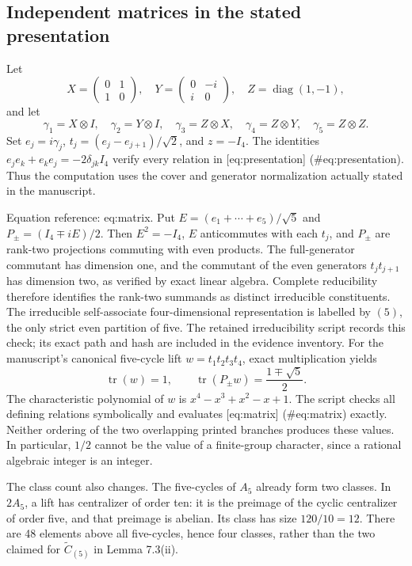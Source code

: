\documentclass[10pt]{article}
\begin{document}
\subsection*{Independent matrices in the stated presentation}
Let \[X=\begin{pmatrix}0&1\\1&0\end{pmatrix},\quad
 Y=\begin{pmatrix}0&-i\\i&0\end{pmatrix},\quad
 Z=\operatorname{diag}(1,-1),\] and let \[\gamma_1=X\otimes I,\quad \gamma_2=Y\otimes I,\quad
 \gamma_3=Z\otimes X,\quad \gamma_4=Z\otimes Y,\quad
 \gamma_5=Z\otimes Z.\] Set \(e_j=i\gamma_j\), \(t_j=(e_j-e_{j+1})/\sqrt2\), and \(z=-I_4\). The identities \(e_je_k+e_ke_j=-2\delta_{jk}I_4\) verify every relation in [eq:presentation] (\#eq:presentation). Thus the computation uses the cover and generator normalization actually stated in the manuscript.\par
Equation reference: eq:matrix. Put \(E=(e_1+\cdots+e_5)/\sqrt5\) and \(P_\pm=(I_4\mp iE)/2\). Then \(E^2=-I_4\), \(E\) anticommutes with each \(t_j\), and \(P_\pm\) are rank-two projections commuting with even products. The full-generator commutant has dimension one, and the commutant of the even generators \(t_jt_{j+1}\) has dimension two, as verified by exact linear algebra. Complete reducibility therefore identifies the rank-two summands as distinct irreducible constituents. The irreducible self-associate four-dimensional representation is labelled by \((5)\), the only strict even partition of five. The retained irreducibility script records this check; its exact path and hash are included in the evidence inventory. For the manuscript’s canonical five-cycle lift \(w=t_1t_2t_3t_4\), exact multiplication yields \[
 \operatorname{tr}(w)=1,\qquad
 \operatorname{tr}(P_\pm w)=\frac{1\mp\sqrt5}{2}.\] The characteristic polynomial of \(w\) is \(x^4-x^3+x^2-x+1\). The script checks all defining relations symbolically and evaluates [eq:matrix] (\#eq:matrix) exactly. Neither ordering of the two overlapping printed branches produces these values. In particular, \(1/2\) cannot be the value of a finite-group character, since a rational algebraic integer is an integer.\par
The class count also changes. The five-cycles of \(A_5\) already form two classes. In \(2A_5\), a lift has centralizer of order ten: it is the preimage of the cyclic centralizer of order five, and that preimage is abelian. Its class has size \(120/10=12\). There are 48 elements above all five-cycles, hence four classes, rather than the two claimed for \(\widetilde C_{(5)}\) in Lemma 7.3(ii).\par
\end{document}
